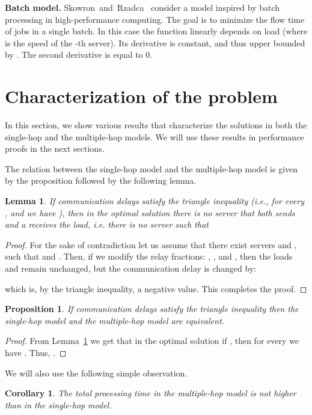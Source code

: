 \documentclass[11pt]{article}
\newtheorem{proposition}[theorem]{Proposition}
\newtheorem{corollary}[theorem]{Corollary}
\newtheorem{lemma}[theorem]{Lemma}
\begin{document}
\medskip
\noindent
\textbf{Batch model.}\quad
Skowron~and~Rzadca~\cite{Skowron:2013:NDL:2510648.2510769} consider a model inspired by batch processing in high-performance computing. 
The goal is to minimize the flow time of jobs in a single batch.
In this case the function  linearly depends on load  (where  is the speed of the -th server). 
Its derivative is constant, and thus upper bounded by . The second derivative is equal to 0.


\section{Characterization of the problem}
In this section, we show various results that characterize the solutions in both the single-hop and the multiple-hop models. We will use these results in performance proofs in the next sections.

The relation between the single-hop model and the multiple-hop model is given by the proposition followed by the following lemma.

\begin{lemma}\label{lemma:recevAndSend}
If communication delays satisfy the triangle inequality (i.e., for every , and  we have ), then in the optimal solution there is no server  that both sends and a receives the load, i.e. there is no server  such that 
\end{lemma}
\begin{proof}
For the sake of contradiction let us assume that there exist servers  and , such that  and . Then, if we modify the relay fractions: , , and , then the loads  and  remain unchanged, but the communication delay is changed by:

which is, by the triangle inequality, a negative value. This completes the proof.
\end{proof}

\begin{proposition}\label{prop:multiSingleHopEquiv}
If communication delays satisfy the triangle inequality then the single-hop model and the multiple-hop model are equivalent.
\end{proposition}
\begin{proof}
From Lemma~\ref{lemma:recevAndSend} we get that in the optimal solution if , then for every  we have . Thus, .
\end{proof}

We will also use the following simple observation.

\begin{corollary}\label{prop:multiBellerSingleHop}
The total processing time in the multiple-hop model is not higher than in the single-hop model.
\end{corollary}
\end{document}
